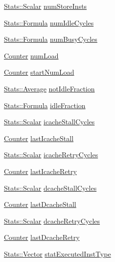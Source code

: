 \begin{DoxyCompactItemize}
\item 
\hyperlink{classStats_1_1Scalar}{Stats::Scalar} \hyperlink{classBaseSimpleCPU_a597ae298ef74a2f5578c27208781c44c}{numStoreInsts}
\item 
\hyperlink{classStats_1_1Formula}{Stats::Formula} \hyperlink{classBaseSimpleCPU_af52194e661180e3b96c4cecb634f2051}{numIdleCycles}
\item 
\hyperlink{classStats_1_1Formula}{Stats::Formula} \hyperlink{classBaseSimpleCPU_a7298dfe65dbb56979d6cb073fcb92a74}{numBusyCycles}
\item 
\hyperlink{base_2types_8hh_ae1475755791765b8e6f6a8bb091e273e}{Counter} \hyperlink{classBaseSimpleCPU_a9c78b70028e5df92b15a6fd9c56e5acf}{numLoad}
\item 
\hyperlink{base_2types_8hh_ae1475755791765b8e6f6a8bb091e273e}{Counter} \hyperlink{classBaseSimpleCPU_abc2dac603f413be8cd5f63b5c0b2d48d}{startNumLoad}
\item 
\hyperlink{classStats_1_1Average}{Stats::Average} \hyperlink{classBaseSimpleCPU_a40be38a691cf502b6ba46aaefd86dc77}{notIdleFraction}
\item 
\hyperlink{classStats_1_1Formula}{Stats::Formula} \hyperlink{classBaseSimpleCPU_a591131fa4ec30e59631a01f16393430e}{idleFraction}
\item 
\hyperlink{classStats_1_1Scalar}{Stats::Scalar} \hyperlink{classBaseSimpleCPU_a2b9328bdb1a6898bfae824981cd64311}{icacheStallCycles}
\item 
\hyperlink{base_2types_8hh_ae1475755791765b8e6f6a8bb091e273e}{Counter} \hyperlink{classBaseSimpleCPU_a3e096aa6ed4182585302ca5aff38aa3a}{lastIcacheStall}
\item 
\hyperlink{classStats_1_1Scalar}{Stats::Scalar} \hyperlink{classBaseSimpleCPU_a86adafbcd047a925dfe292a237b44e79}{icacheRetryCycles}
\item 
\hyperlink{base_2types_8hh_ae1475755791765b8e6f6a8bb091e273e}{Counter} \hyperlink{classBaseSimpleCPU_aa608cdd1d274fea9cbc038ab248469a1}{lastIcacheRetry}
\item 
\hyperlink{classStats_1_1Scalar}{Stats::Scalar} \hyperlink{classBaseSimpleCPU_a06d11574ef2a7c403c51d626e834d91e}{dcacheStallCycles}
\item 
\hyperlink{base_2types_8hh_ae1475755791765b8e6f6a8bb091e273e}{Counter} \hyperlink{classBaseSimpleCPU_a8b4696062ef09ab956804a7a99491853}{lastDcacheStall}
\item 
\hyperlink{classStats_1_1Scalar}{Stats::Scalar} \hyperlink{classBaseSimpleCPU_ae2ea7ce061e493bd28fe16d53d15d7b6}{dcacheRetryCycles}
\item 
\hyperlink{base_2types_8hh_ae1475755791765b8e6f6a8bb091e273e}{Counter} \hyperlink{classBaseSimpleCPU_af97b90e0b2b4a4e3fdb86e11f83e85e7}{lastDcacheRetry}
\item 
\hyperlink{classStats_1_1Vector}{Stats::Vector} \hyperlink{classBaseSimpleCPU_aab593a3a00eaa614f40b6d66bec24e35}{statExecutedInstType}
\end{DoxyCompactItemize}
